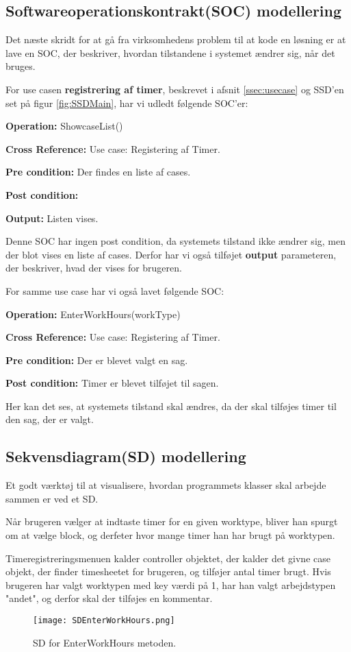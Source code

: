 \subsection{Softwareoperationskontrakt(SOC) modellering}

Det næste skridt for at gå fra virksomhedens problem til at kode en løsning er at lave en SOC, der beskriver, hvordan tilstandene i systemet ændrer sig, når det bruges.

For use casen \textbf{registrering af timer}, beskrevet i afsnit \ref{ssec:usecase} og SSD'en set på figur \ref{fig:SSDMain}, har vi udledt følgende SOC'er:

\textbf{Operation:} ShowcaseList()

\textbf{Cross Reference:} Use case: Registering af Timer.

\textbf{Pre condition:} Der findes en liste af cases.

\textbf{Post condition:}

\textbf{Output:} Listen vises.

Denne SOC har ingen post condition, da systemets tilstand ikke ændrer sig, men der blot vises en liste af cases.
Derfor har vi også tilføjet \textbf{output} parameteren, der beskriver, hvad der vises for brugeren.

For samme use case har vi også lavet følgende SOC:

\textbf{Operation:} EnterWorkHours(workType)

\textbf{Cross Reference:} Use case: Registering af Timer.

\textbf{Pre condition:} Der er blevet valgt en sag.

\textbf{Post condition:} Timer er blevet tilføjet til sagen.

Her kan det ses, at systemets tilstand skal ændres, da der skal tilføjes timer til den sag, der er valgt.

\subsection{Sekvensdiagram(SD) modellering}

Et godt værktøj til at visualisere, hvordan programmets klasser skal arbejde sammen er ved et SD.

Når brugeren vælger at indtaste timer for en given worktype, bliver han spurgt om at vælge block, og derfeter hvor mange timer han har brugt på worktypen.

Timeregistreringsmenuen kalder controller objektet, der kalder det givne case objekt, der finder timesheetet for brugeren, og tilføjer antal timer brugt.
Hvis brugeren har valgt worktypen med key værdi på 1, har han valgt arbejdstypen "andet", og derfor skal der tilføjes en kommentar.
\begin{sidewaysfigure}
    \centering
        \texttt{[image: SDEnterWorkHours.png]}
    \caption{SD for EnterWorkHours metoden.}
    \label{fig:SDEnterWorkHours}
\end{sidewaysfigure}

